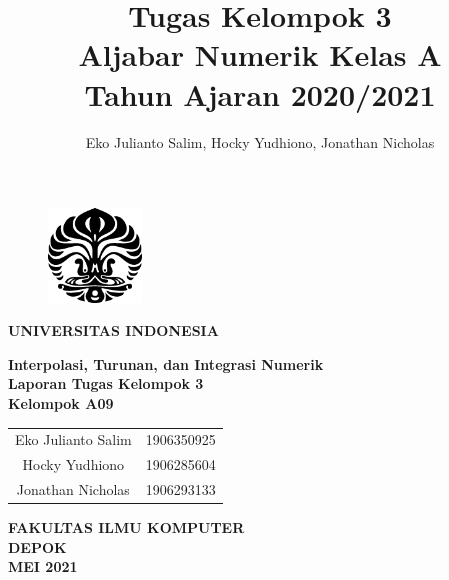 \documentclass[11pt, a4paper, onecolumn, oneside, final]{report}
\title{Tugas Kelompok 3\\Aljabar Numerik Kelas A\\Tahun Ajaran 2020/2021}
\author{Eko Julianto Salim, Hocky Yudhiono, Jonathan Nicholas}
\begin{document}
\begin{titlepage}
    \begin{center}\begin{figure}
            \begin{center}
                \includegraphics[width=2.5cm]{makara.eps}
            \end{center}
        \end{figure}    
        \vspace*{0cm}
        \textbf{
        	UNIVERSITAS INDONESIA\\
        }
        
        \vspace*{1.0cm}
        \textbf{Interpolasi, Turunan, dan Integrasi Numerik} \\[1.0cm]

        \vspace*{2.5 cm}    
        \textbf{Laporan Tugas Kelompok 3} \\
        
        \vspace*{3 cm}
        \textbf{Kelompok A09} \\
        
\begin{table}[H]
        \centering
        \begin{tabular}{c c}
            Eko Julianto Salim & 1906350925\\
            Hocky Yudhiono & 1906285604 \\
            Jonathan Nicholas & 1906293133\\
        \end{tabular}
        \end{table}
        \vspace*{5.0cm}

        \textbf{
        	FAKULTAS ILMU KOMPUTER\\
        	DEPOK \\
        	MEI 2021
        }
    \end{center}
\end{titlepage}
\end{document}
